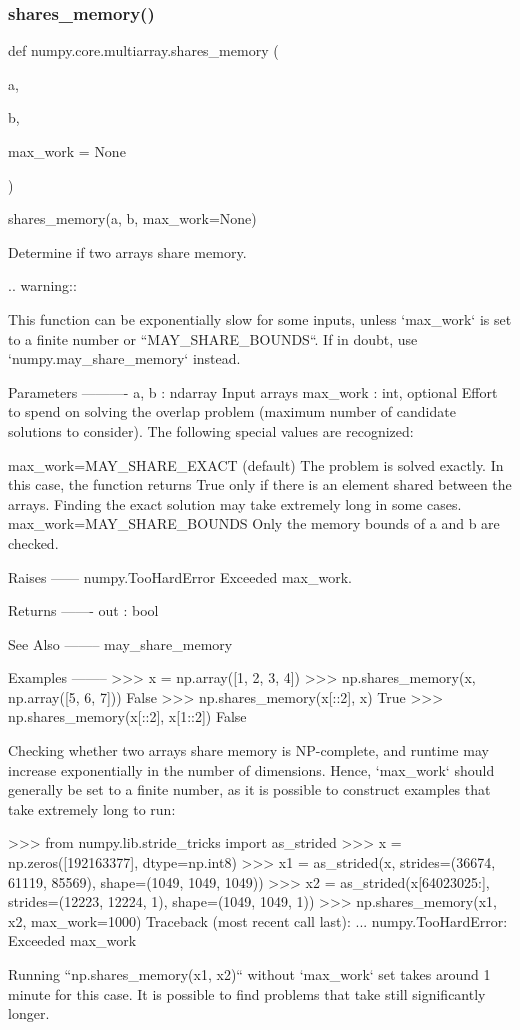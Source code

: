 \subsubsection{\texorpdfstring{shares\+\_\+memory()}{shares\_memory()}}
{\footnotesize\ttfamily def numpy.\+core.\+multiarray.\+shares\+\_\+memory (\begin{DoxyParamCaption}\item[{}]{a,  }\item[{}]{b,  }\item[{}]{max\+\_\+work = {\ttfamily None} }\end{DoxyParamCaption})}

\begin{DoxyVerb}shares_memory(a, b, max_work=None)

Determine if two arrays share memory.

.. warning::

   This function can be exponentially slow for some inputs, unless
   `max_work` is set to a finite number or ``MAY_SHARE_BOUNDS``.
   If in doubt, use `numpy.may_share_memory` instead.

Parameters
----------
a, b : ndarray
    Input arrays
max_work : int, optional
    Effort to spend on solving the overlap problem (maximum number
    of candidate solutions to consider). The following special
    values are recognized:

    max_work=MAY_SHARE_EXACT  (default)
        The problem is solved exactly. In this case, the function returns
        True only if there is an element shared between the arrays. Finding
        the exact solution may take extremely long in some cases.
    max_work=MAY_SHARE_BOUNDS
        Only the memory bounds of a and b are checked.

Raises
------
numpy.TooHardError
    Exceeded max_work.

Returns
-------
out : bool

See Also
--------
may_share_memory

Examples
--------
>>> x = np.array([1, 2, 3, 4])
>>> np.shares_memory(x, np.array([5, 6, 7]))
False
>>> np.shares_memory(x[::2], x)
True
>>> np.shares_memory(x[::2], x[1::2])
False

Checking whether two arrays share memory is NP-complete, and
runtime may increase exponentially in the number of
dimensions. Hence, `max_work` should generally be set to a finite
number, as it is possible to construct examples that take
extremely long to run:

>>> from numpy.lib.stride_tricks import as_strided
>>> x = np.zeros([192163377], dtype=np.int8)
>>> x1 = as_strided(x, strides=(36674, 61119, 85569), shape=(1049, 1049, 1049))
>>> x2 = as_strided(x[64023025:], strides=(12223, 12224, 1), shape=(1049, 1049, 1))
>>> np.shares_memory(x1, x2, max_work=1000)
Traceback (most recent call last):
...
numpy.TooHardError: Exceeded max_work

Running ``np.shares_memory(x1, x2)`` without `max_work` set takes
around 1 minute for this case. It is possible to find problems
that take still significantly longer.\end{DoxyVerb}
